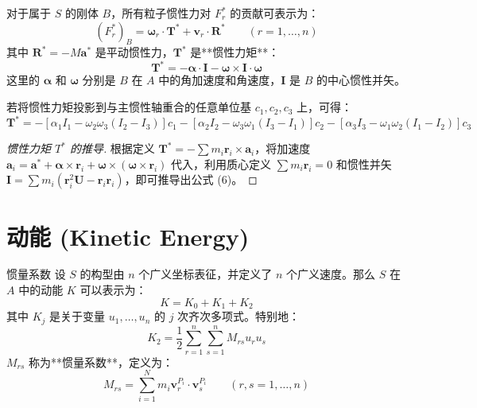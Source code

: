 对于属于 \(S\) 的刚体 \(B\)，所有粒子惯性力对 \(F_r^*\) 的贡献可表示为：
\begin{equation}
(F_r^*)_B = \boldsymbol{\omega}_r \cdot \mathbf{T}^* + \mathbf{v}_r \cdot \mathbf{R}^* \qquad (r=1,\dots,n) \tag{5}
\end{equation}
其中 \(\mathbf{R}^* = -M\mathbf{a}^*\) 是平动惯性力，\(\mathbf{T}^*\) 是**惯性力矩**：
\begin{equation}
\mathbf{T}^* = -\boldsymbol{\alpha} \cdot \mathbf{I} - \boldsymbol{\omega} \times \mathbf{I} \cdot \boldsymbol{\omega} \tag{6}
\end{equation}
这里的 \(\boldsymbol{\alpha}\) 和 \(\boldsymbol{\omega}\) 分别是 \(B\) 在 \(A\) 中的角加速度和角速度，\(\mathbf{I}\) 是 \(B\) 的中心惯性并矢。

若将惯性力矩投影到与主惯性轴重合的任意单位基 \(c_1,c_2,c_3\) 上，可得：
\begin{equation}
\mathbf{T}^* = -[\alpha_1 I_1 - \omega_2\omega_3(I_2 - I_3)]c_1 - [\alpha_2 I_2 - \omega_3\omega_1(I_3 - I_1)]c_2 - [\alpha_3 I_3 - \omega_1\omega_2(I_1 - I_2)]c_3 \tag{8}
\end{equation}

\begin{proof}[惯性力矩 \(T^*\) 的推导]
根据定义 \(\mathbf{T}^* = -\sum m_i \mathbf{r}_i \times \mathbf{a}_i\)，将加速度 \(\mathbf{a}_i = \mathbf{a}^* + \boldsymbol{\alpha} \times \mathbf{r}_i + \boldsymbol{\omega} \times (\boldsymbol{\omega} \times \mathbf{r}_i)\) 代入，利用质心定义 \(\sum m_i \mathbf{r}_i = 0\) 和惯性并矢 \(\mathbf{I} = \sum m_i(\mathbf{r}_i^2 \mathbf{U} - \mathbf{r}_i\mathbf{r}_i)\)，即可推导出公式 (6)。
\end{proof}

\section{动能 (Kinetic Energy)}

\begin{mydefinition}{惯量系数}
设 \(S\) 的构型由 \(n\) 个广义坐标表征，并定义了 \(n\) 个广义速度。那么 \(S\) 在 \(A\) 中的动能 \(K\) 可以表示为：
\begin{equation}
K = K_0 + K_1 + K_2 \tag{1}
\end{equation}
其中 \(K_j\) 是关于变量 \(u_1,\dots,u_n\) 的 \(j\) 次齐次多项式。特别地：
\begin{equation}
K_2 = \frac{1}{2}\sum_{r=1}^n \sum_{s=1}^n M_{rs} u_r u_s \tag{2}
\end{equation}
\(M_{rs}\) 称为**惯量系数**，定义为：
\begin{equation}
M_{rs} = \sum_{i=1}^N m_i \mathbf{v}_r^{P_i} \cdot \mathbf{v}_s^{P_i} \qquad (r,s=1,\dots,n) \tag{3}
\end{equation}
\end{mydefinition}

